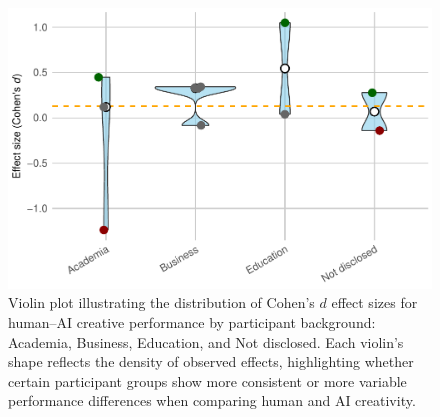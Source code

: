 \documentclass[acmsmall,authorversion]{acmart}
\begin{document}
\begin{figure}[H]
  \centering
  \includegraphics[width=\linewidth]{plot_performance_violin_participants}
  \caption{Violin plot illustrating the distribution of Cohen’s $d$ effect sizes for human–AI creative performance by participant background: Academia, Business, Education, and Not disclosed. Each violin’s shape reflects the density of observed effects, highlighting whether certain participant groups show more consistent or more variable performance differences when comparing human and AI creativity.}
  \label{fig:performance_violin_participants}
\end{figure}
\end{document}

